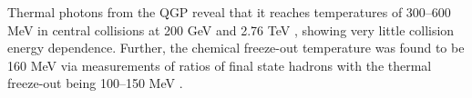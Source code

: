 Thermal photons from the QGP reveal that it reaches temperatures of 300--600 MeV in central collisions at 200 GeV \cite{PhysRevLett.104.132301} and 2.76 TeV \cite{2016235}, showing very little collision energy dependence. Further, the chemical freeze-out temperature was found to be 160 MeV via  measurements of ratios of final state hadrons \cite{Fodor_2004,ADAMS2005102, PhysRevC.93.024917} with the thermal freeze-out being 100--150 MeV \cite{PhysRevC.69.024904, PhysRevC.72.014908, PhysRevC.75.024910, PhysRevC.88.044910}.

